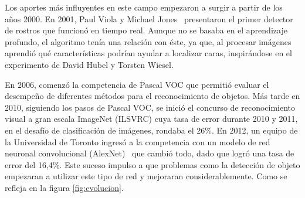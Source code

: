 Los aportes más influyentes en este campo empezaron a surgir a partir de los años 2000. En 2001, Paul Viola y Michael Jones~\cite{viola2001rapid} presentaron el primer detector de rostros que funcionó en tiempo real. Aunque no se basaba en el aprendizaje profundo, el algoritmo tenía una relación con éste, ya que, al procesar imágenes aprendió qué características podrían ayudar a localizar caras, inspirándose en el experimento de David Hubel y Torsten Wiesel. 

En 2006, comenzó la competencia de Pascal VOC que permitió evaluar el desempeño de diferentes métodos para el reconocimiento de objetos. Más tarde en 2010, siguiendo los pasos de Pascal VOC, se inició el concurso de reconocimiento visual a gran escala ImageNet (ILSVRC) cuya tasa de error durante 2010 y 2011, en el desafío de clasificación de imágenes, rondaba el 26\%.  En 2012, un equipo de la Universidad de Toronto ingresó a la competencia con un modelo de red neuronal convolucional (AlexNet)~\cite{krizhevsky2012imagenet} que cambió todo, dado que logró una tasa de error del 16,4\%. Este suceso impulso a que problemas como la detección de objeto empezaran a utilizar este tipo de red y mejoraran considerablemente. Como se refleja en la figura \autoref{fig:evolucion}.

